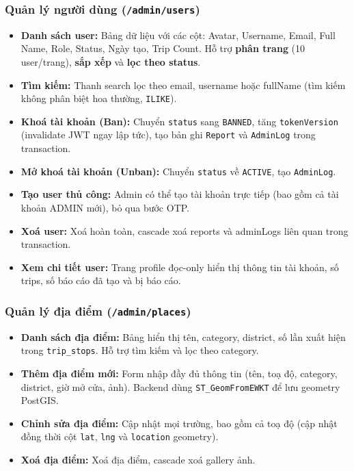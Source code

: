 \documentclass[12pt,a4paper]{article}
\begin{document}
\subsubsection{Quản lý người dùng (\texttt{/admin/users})}

\begin{itemize}
  \item \textbf{Danh sách user:} Bảng dữ liệu với các cột: Avatar, Username,
        Email, Full Name, Role, Status, Ngày tạo, Trip Count. Hỗ trợ
        \textbf{phân trang} (10 user/trang), \textbf{sắp xếp} và
        \textbf{lọc theo status}.
  \item \textbf{Tìm kiếm:} Thanh search lọc theo email, username hoặc
        fullName (tìm kiếm không phân biệt hoa thường, \texttt{ILIKE}).
  \item \textbf{Khoá tài khoản (Ban):} Chuyển \texttt{status} sang
        \texttt{BANNED}, tăng \texttt{tokenVersion} (invalidate JWT ngay lập
        tức), tạo bản ghi \texttt{Report} và \texttt{AdminLog} trong
        transaction.
  \item \textbf{Mở khoá tài khoản (Unban):} Chuyển \texttt{status} về
        \texttt{ACTIVE}, tạo \texttt{AdminLog}.
  \item \textbf{Tạo user thủ công:} Admin có thể tạo tài khoản trực tiếp
        (bao gồm cả tài khoản ADMIN mới), bỏ qua bước OTP.
  \item \textbf{Xoá user:} Xoá hoàn toàn, cascade xoá reports và adminLogs
        liên quan trong transaction.
  \item \textbf{Xem chi tiết user:} Trang profile đọc-only hiển thị thông
        tin tài khoản, số trips, số báo cáo đã tạo và bị báo cáo.
\end{itemize}

\subsubsection{Quản lý địa điểm (\texttt{/admin/places})}

\begin{itemize}
  \item \textbf{Danh sách địa điểm:} Bảng hiển thị tên, category, district,
        số lần xuất hiện trong \texttt{trip\_stops}. Hỗ trợ tìm kiếm và lọc
        theo category.
  \item \textbf{Thêm địa điểm mới:} Form nhập đầy đủ thông tin (tên, toạ độ,
        category, district, giờ mở cửa, ảnh). Backend dùng
        \texttt{ST\_GeomFromEWKT} để lưu geometry PostGIS.
  \item \textbf{Chỉnh sửa địa điểm:} Cập nhật mọi trường, bao gồm cả toạ độ
        (cập nhật đồng thời cột \texttt{lat}, \texttt{lng} và
        \texttt{location} geometry).
  \item \textbf{Xoá địa điểm:} Xoá địa điểm, cascade xoá gallery ảnh.
\end{itemize}
\end{document}
